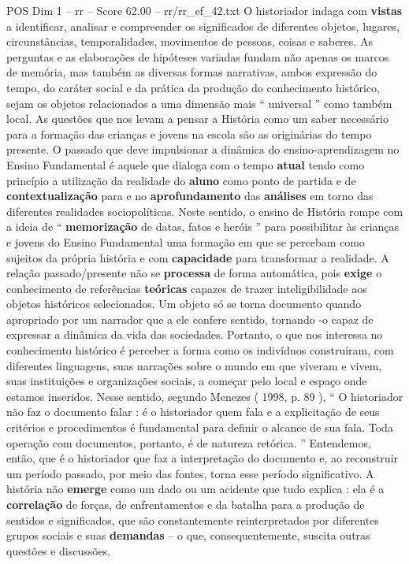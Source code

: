 \begin{textsample}{POS Dim 1 – rr – Score 62.00 – rr/rr\_ef\_42.txt}
O historiador indaga com \textbf{vistas} a identificar, analisar e compreender os significados de diferentes objetos, lugares, circunstâncias, temporalidades, movimentos de pessoas, coisas e saberes.
As perguntas e as elaborações de hipóteses variadas fundam não apenas os marcos de memória, mas também as diversas formas narrativas, ambos expressão do tempo, do caráter social e da prática da produção do conhecimento histórico, sejam os objetos relacionados a uma dimensão mais “ universal ” como também local.
As questões que nos levam a pensar a História como um saber necessário para a formação das crianças e jovens na escola são as originárias do tempo presente.
O passado que deve impulsionar a dinâmica do ensino-aprendizagem no Ensino Fundamental é aquele que dialoga com o tempo \textbf{atual} tendo como princípio a utilização da realidade do \textbf{aluno} como ponto de partida e de \textbf{contextualização} para e no \textbf{aprofundamento} das \textbf{análises} em torno das diferentes realidades sociopolíticas.
Neste sentido, o ensino de História rompe com a ideia de “ \textbf{memorização} de datas, fatos e heróis ” para possibilitar às crianças e jovens do Ensino Fundamental uma formação em que se percebam como sujeitos da própria história e com \textbf{capacidade} para transformar a realidade.
A relação passado/presente não se \textbf{processa} de forma automática, pois \textbf{exige} o conhecimento de referências \textbf{teóricas} capazes de trazer inteligibilidade aos objetos históricos selecionados.
Um objeto só se torna documento quando apropriado por um narrador que a ele confere sentido, tornando -o capaz de expressar a dinâmica da vida das sociedades.
Portanto, o que nos interessa no conhecimento histórico é perceber a forma como os indivíduos construíram, com diferentes linguagens, suas narrações sobre o mundo em que viveram e vivem, suas instituições e organizações sociais, a começar pelo local e espaço onde estamos inseridos.
Nesse sentido, segundo Menezes ( 1998, p. 89 ), “ O historiador não faz o documento falar : é o historiador quem fala e a explicitação de seus critérios e procedimentos é fundamental para definir o alcance de sua fala.
Toda operação com documentos, portanto, é de natureza retórica. ” Entendemos, então, que é o historiador que faz a interpretação do documento e, ao reconstruir um período passado, por meio das fontes, torna esse período significativo.
A história não \textbf{emerge} como um dado ou um acidente que tudo explica : ela é a \textbf{correlação} de forças, de enfrentamentos e da batalha para a produção de sentidos e significados, que são constantemente reinterpretados por diferentes grupos sociais e suas \textbf{demandas} – o que, consequentemente, suscita outras questões e discussões.

\end{textsample}
